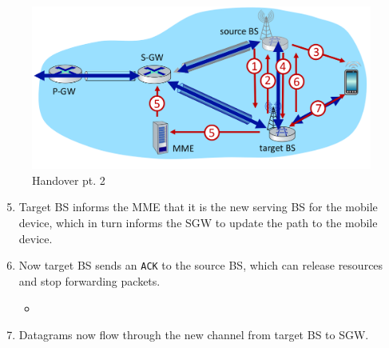 \begin{paracol}{2}
   \begin{figure}[htbp]
      \centering
      \includegraphics{images/4g_BSHO2.png}
      \caption{Handover pt. 2}
      \label{fig:4g_BSHO2}
   \end{figure}
   \switchcolumn
   \begin{enumerate}
      \setcounter{enumi}{4}
      \item Target BS informs the MME that it is the new serving BS for the mobile device, which in turn informs the SGW to update the path to the mobile device.
      \item Now target BS sends an \texttt{ACK} to the source BS, which can release resources and stop forwarding packets.
      \begin{itemize}
         \item {}
      \end{itemize}
      \item Datagrams now flow through the new channel from target BS to SGW.
   \end{enumerate}
\end{paracol}